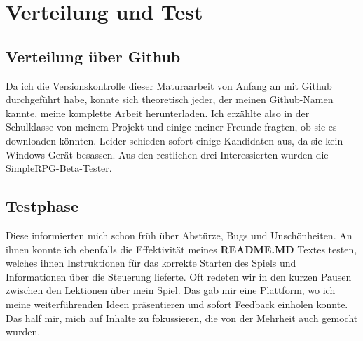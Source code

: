 \section{Verteilung und Test}

\subsection{Verteilung über Github}

Da ich die Versionskontrolle dieser Maturaarbeit von Anfang an mit Github durchgeführt habe, konnte sich theoretisch jeder, der meinen Github-Namen kannte, meine komplette Arbeit herunterladen.\cite{csomormaturaarbeit19github}
Ich erzählte also in der Schulklasse von meinem Projekt und einige meiner Freunde fragten, ob sie es downloaden könnten. Leider schieden sofort einige Kandidaten aus, da sie kein Windows-Gerät besassen. Aus den restlichen drei Interessierten wurden die SimpleRPG-Beta-Tester.

\subsection{Testphase}

Diese informierten mich schon früh über Abstürze, Bugs und Unschönheiten.
An ihnen konnte ich ebenfalls die Effektivität meines \textbf{README.MD} Textes testen, welches ihnen Instruktionen für das korrekte Starten des Spiels und Informationen über die Steuerung lieferte.
Oft redeten wir in den kurzen Pausen zwischen den Lektionen über mein Spiel.
Das gab mir eine Plattform, wo ich meine weiterführenden Ideen präsentieren und sofort Feedback einholen konnte. Das half mir, mich auf Inhalte zu fokussieren, die von der Mehrheit auch gemocht wurden.


